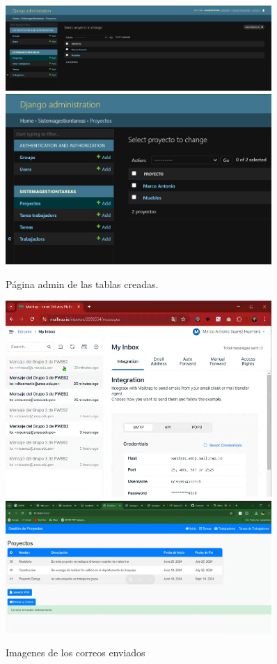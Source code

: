 \documentclass{article}
\begin{document}
\begin{itemize}
\begin{figure}[h]
    \centering
    \includegraphics[width=0.9\textwidth]{img/template4.png}
    \includegraphics[width=0.9\textwidth]{img/template5.png}
    \caption{Página admin de las tablas creadas.}
\end{figure}

\begin{figure}[h]
    \centering
    \includegraphics[width=0.9\textwidth]{img/correo.png}
    \includegraphics[width=0.9\textwidth]{img/correo1.png}
    \caption{Imagenes de los correos enviados}
\end{figure}


\end{itemize}
\end{document}
